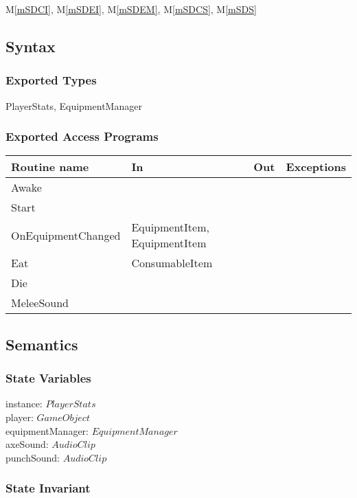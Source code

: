 \documentclass[12pt]{article}
\newcommand{\mref}[1]{M\ref{#1}}
\begin{document}
\mref{mSDCI}, \mref{mSDEI}, \mref{mSDEM}, \mref{mSDCS}, \mref{mSDS}

\subsection* {Syntax}

\subsubsection* {Exported Types}

PlayerStats, {\color{magenta} EquipmentManager}

\subsubsection* {Exported Access Programs}

\begin{tabular}{| l | l | l | l |}
\hline
\textbf{Routine name} & \textbf{In} & \textbf{Out} & \textbf{Exceptions}\\
\hline
Awake & ~ & ~  & ~\\
Start & ~  & ~ & ~\\
OnEquipmentChanged & EquipmentItem, EquipmentItem  & ~ & ~\\
Eat & ConsumableItem  & ~ & ~\\
Die & ~  & ~ & ~\\
{\color{magenta} MeleeSound} & ~  & ~ & ~\\
\hline
\end{tabular}

\subsection* {Semantics}

\subsubsection* {State Variables}

instance: $PlayerStats$ \\
player: $GameObject$ \\
{\color{magenta} equipmentManager: $EquipmentManager$} \\
{\color{magenta} axeSound: $AudioClip$} \\
{\color{magenta} punchSound: $AudioClip$} \\

\subsubsection* {State Invariant}
\end{document}
